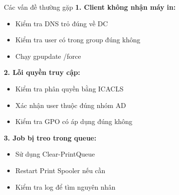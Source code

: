\documentclass{beamer}
\begin{document}
    \begin{frame}{Các vấn đề thường gặp}
        \textbf{1. Client không nhận máy in:}
        \begin{itemize}
            \item Kiểm tra DNS trỏ đúng về DC
            \item Kiểm tra user có trong group đúng không
            \item Chạy gpupdate /force
        \end{itemize}
        
        \vspace{0.3cm}
        \textbf{2. Lỗi quyền truy cập:}
        \begin{itemize}
            \item Kiểm tra phân quyền bằng ICACLS
            \item Xác nhận user thuộc đúng nhóm AD
            \item Kiểm tra GPO có áp dụng đúng không
        \end{itemize}
        
        \vspace{0.3cm}
        \textbf{3. Job bị treo trong queue:}
        \begin{itemize}
            \item Sử dụng Clear-PrintQueue
            \item Restart Print Spooler nếu cần
            \item Kiểm tra log để tìm nguyên nhân
        \end{itemize}
    \end{frame}

\end{document}
